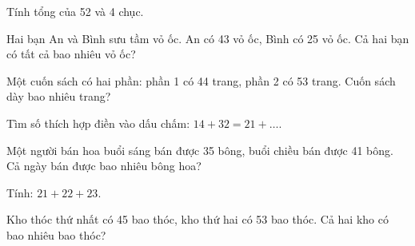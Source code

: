 \begin{ex}
Tính tổng của 52 và 4 chục.
\end{ex}

\begin{ex}
Hai bạn An và Bình sưu tầm vỏ ốc. An có 43 vỏ ốc, Bình có 25 vỏ ốc. Cả hai bạn có tất cả bao nhiêu vỏ ốc?
\end{ex}

\begin{ex}
Một cuốn sách có hai phần: phần 1 có 44 trang, phần 2 có 53 trang. Cuốn sách dày bao nhiêu trang?
\end{ex}

\begin{ex}
Tìm số thích hợp điền vào dấu chấm: $14 + 32 = 21 + \dots$.
\end{ex}

\begin{ex}
Một người bán hoa buổi sáng bán được 35 bông, buổi chiều bán được 41 bông. Cả ngày bán được bao nhiêu bông hoa?
\end{ex}

\begin{ex}
Tính: $21 + 22 + 23$.
\end{ex}

\begin{ex}
Kho thóc thứ nhất có 45 bao thóc, kho thứ hai có 53 bao thóc. Cả hai kho có bao nhiêu bao thóc?
\end{ex}
